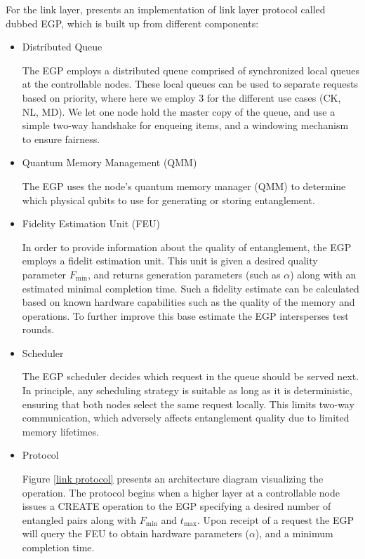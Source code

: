\documentclass[10pt]{article}
\begin{document}
For the link layer, \cite{dahlberg2019link} presents an implementation of link layer protocol called dubbed EGP, which is built up from different components:
\begin{itemize}
    \item Distributed Queue
    
    The EGP employs a distributed queue comprised of synchronized local queues at the controllable nodes. These local queues can be used to separate requests based on priority, where here we employ 3 for the different use cases (CK, NL, MD). We let one node hold the master copy of the queue, and use a simple two-way handshake for enqueing items, and
    a windowing mechanism to ensure fairness.

    \item Quantum Memory Management (QMM)
    
    The EGP uses the node’s quantum memory manager (QMM) to determine which physical qubits to use for generating or storing entanglement.


    \item  Fidelity Estimation Unit (FEU)
    
    In order to provide information about the quality of entanglement, the EGP employs a fidelit estimation unit. This unit is given a desired quality parameter $F_{\min}$, and returns generation parameters (such as $\alpha$) along with an estimated minimal completion time.
    Such a fidelity estimate can be calculated based on known hardware capabilities such as the quality of the memory and operations. To further improve this base estimate the EGP intersperses test rounds.

    \item Scheduler
    
    The EGP scheduler decides which request in the queue should be served next. In principle, any scheduling strategy is suitable as long as it is deterministic, ensuring that both nodes select the same request locally. This limits two-way communication, which adversely affects entanglement quality due to limited memory lifetimes.

    \item Protocol 
    
    Figure \ref{link protocol} presents an architecture diagram visualizing the operation. The protocol begins when a higher layer at a controllable node issues a CREATE operation to the EGP specifying a desired number of entangled pairs along with $F_{\min}$ and $t_{\max}$. Upon receipt of a request the EGP will query the FEU to obtain hardware parameters ($\alpha$), and a minimum completion time. 


\end{itemize}
\end{document}
